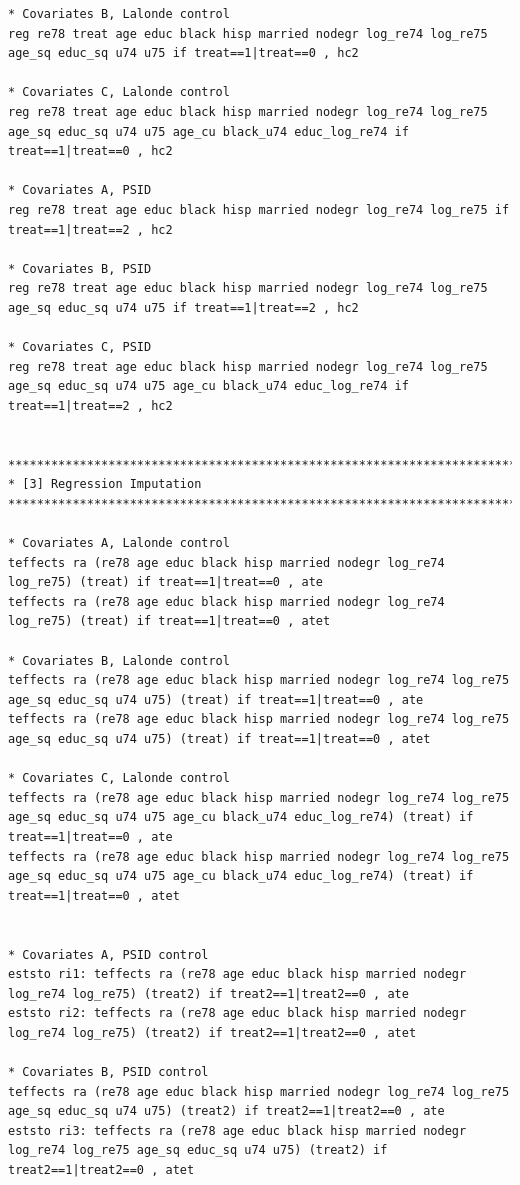 \documentclass[12pt]{article}
\begin{document}
\begin{verbatim}
* Covariates B, Lalonde control
reg re78 treat age educ black hisp married nodegr log_re74 log_re75 age_sq educ_sq u74 u75 if treat==1|treat==0 , hc2

* Covariates C, Lalonde control
reg re78 treat age educ black hisp married nodegr log_re74 log_re75 age_sq educ_sq u74 u75 age_cu black_u74 educ_log_re74 if treat==1|treat==0 , hc2

* Covariates A, PSID
reg re78 treat age educ black hisp married nodegr log_re74 log_re75 if treat==1|treat==2 , hc2

* Covariates B, PSID
reg re78 treat age educ black hisp married nodegr log_re74 log_re75 age_sq educ_sq u74 u75 if treat==1|treat==2 , hc2

* Covariates C, PSID
reg re78 treat age educ black hisp married nodegr log_re74 log_re75 age_sq educ_sq u74 u75 age_cu black_u74 educ_log_re74 if treat==1|treat==2 , hc2


********************************************************************************
* [3] Regression Imputation 
********************************************************************************

* Covariates A, Lalonde control
teffects ra (re78 age educ black hisp married nodegr log_re74 log_re75) (treat) if treat==1|treat==0 , ate 
teffects ra (re78 age educ black hisp married nodegr log_re74 log_re75) (treat) if treat==1|treat==0 , atet

* Covariates B, Lalonde control
teffects ra (re78 age educ black hisp married nodegr log_re74 log_re75 age_sq educ_sq u74 u75) (treat) if treat==1|treat==0 , ate 
teffects ra (re78 age educ black hisp married nodegr log_re74 log_re75 age_sq educ_sq u74 u75) (treat) if treat==1|treat==0 , atet 

* Covariates C, Lalonde control
teffects ra (re78 age educ black hisp married nodegr log_re74 log_re75 age_sq educ_sq u74 u75 age_cu black_u74 educ_log_re74) (treat) if treat==1|treat==0 , ate 
teffects ra (re78 age educ black hisp married nodegr log_re74 log_re75 age_sq educ_sq u74 u75 age_cu black_u74 educ_log_re74) (treat) if treat==1|treat==0 , atet 


* Covariates A, PSID control
eststo ri1: teffects ra (re78 age educ black hisp married nodegr log_re74 log_re75) (treat2) if treat2==1|treat2==0 , ate 
eststo ri2: teffects ra (re78 age educ black hisp married nodegr log_re74 log_re75) (treat2) if treat2==1|treat2==0 , atet

* Covariates B, PSID control
teffects ra (re78 age educ black hisp married nodegr log_re74 log_re75 age_sq educ_sq u74 u75) (treat2) if treat2==1|treat2==0 , ate 
eststo ri3: teffects ra (re78 age educ black hisp married nodegr log_re74 log_re75 age_sq educ_sq u74 u75) (treat2) if treat2==1|treat2==0 , atet 


\end{verbatim}
\end{document}
